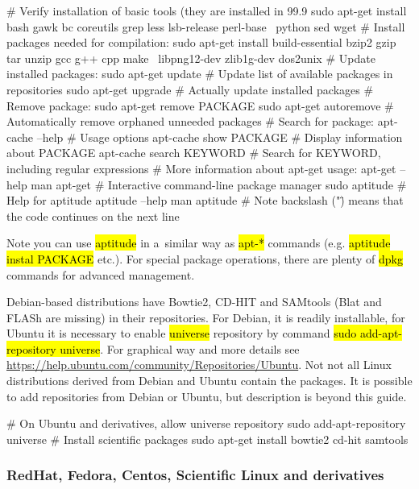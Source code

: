 \documentclass[a4paper, 11pt, twoside]{article}
\renewcommand{\texttt}[1]{\hl{\ttfamily #1}}
\begin{document}
\begin{bashcode}
  # Verify installation of basic tools (they are installed in 99.9%
  sudo apt-get install bash gawk bc coreutils grep less lsb-release perl-base \
    python sed wget
  # Install packages needed for compilation:
  sudo apt-get install build-essential bzip2 gzip tar unzip gcc g++ cpp make \
    libpng12-dev zlib1g-dev dos2unix
  # Update installed packages:
  sudo apt-get update # Update list of available packages in repositories
  sudo apt-get upgrade # Actually update installed packages
  # Remove package:
  sudo apt-get remove PACKAGE
  sudo apt-get autoremove # Automatically remove orphaned unneeded packages
  # Search for package:
  apt-cache --help # Usage options
  apt-cache show PACKAGE # Display information about PACKAGE
  apt-cache search KEYWORD # Search for KEYWORD, including regular expressions
  # More information about apt-get usage:
  apt-get --help
  man apt-get
  # Interactive command-line package manager
  sudo aptitude
  # Help for aptitude
  aptitude --help
  man aptitude
  # Note backslash ("\") means that the code continues on the next line
\end{bashcode}

Note you can use \texttt{aptitude} in a~similar way as \texttt{apt-*} commands (e.g. \texttt{aptitude instal PACKAGE} etc.). For special package operations, there are plenty of \texttt{dpkg} commands for advanced management.

Debian-based distributions have Bowtie2, CD-HIT and SAMtools (Blat and FLASh are missing) in their repositories. For Debian, it is readily installable, for Ubuntu it is necessary to enable \texttt{universe} repository by command \texttt{sudo add-apt-repository universe}. For graphical way and more details see \url{https://help.ubuntu.com/community/Repositories/Ubuntu}. Not not all Linux distributions derived from Debian and Ubuntu contain the packages. It is possible to add repositories from Debian or Ubuntu, but description is beyond this guide.

\begin{bashcode}
  # On Ubuntu and derivatives, allow universe repository
  sudo add-apt-repository universe
  # Install scientific packages
  sudo apt-get install bowtie2 cd-hit samtools
\end{bashcode}

\subsubsection{RedHat, Fedora, Centos, Scientific Linux and derivatives}
\end{document}
